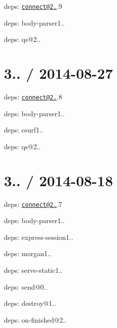 {\ttfamily }

{\ttfamily 
\begin{DoxyItemize}
\item deps\+: \href{mailto:connect@2.25}{\tt connect@2.}.9
\begin{DoxyItemize}
\item deps\+: body-\/parser1..
\item deps\+: qs@2..
\end{DoxyItemize}
\end{DoxyItemize}}

{\ttfamily \section*{3.. / 2014-\/08-\/27 }}

{\ttfamily }

{\ttfamily 
\begin{DoxyItemize}
\item deps\+: \href{mailto:connect@2.25}{\tt connect@2.}.8
\begin{DoxyItemize}
\item deps\+: body-\/parser1..
\item deps\+: csurf1..
\item deps\+: qs@2..
\end{DoxyItemize}
\end{DoxyItemize}}

{\ttfamily \section*{3.. / 2014-\/08-\/18 }}

{\ttfamily }

{\ttfamily 
\begin{DoxyItemize}
\item deps\+: \href{mailto:connect@2.25}{\tt connect@2.}.7
\begin{DoxyItemize}
\item deps\+: body-\/parser1..
\item deps\+: express-\/session1..
\item deps\+: morgan1..
\item deps\+: serve-\/static1..
\end{DoxyItemize}
\item deps\+: send@0..
\begin{DoxyItemize}
\item deps\+: destroy@1..
\item deps\+: on-\/finished@2..
\end{DoxyItemize}
\end{DoxyItemize}}

